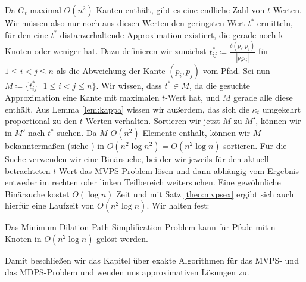 	Da $G_t$ maximal $O(n^2)$ Kanten enthält, gibt es eine endliche Zahl von $t$-Werten. 
	Wir müssen also nur noch aus diesen Werten den geringsten Wert $t^*$ ermitteln, für den eine $t^*$-distanzerhaltende Approximation existiert, die gerade noch k Knoten oder weniger hat. 
	Dazu definieren wir zunächst $t^*_{ij} \coloneqq\frac{\delta(p_i, p_j)}{|p_i p_j|}$ für $1\leq i < j \leq n$ als die Abweichung der Kante $(p_i, p_j)$ vom Pfad. Sei nun $M\coloneqq\{t^*_{ij}\ |\ 1\leq i < j \leq n\}$. 
	Wir wissen, dass $t^* \in M$, da die gesuchte Approximation eine Kante mit maximalen $t$-Wert hat, und $M$ gerade alle diese enthält. 
	Aus Lemma \ref{lem:kappa} wissen wir außerdem, das sich die $\kappa_t$ umgekehrt proportional zu den $t$-Werten verhalten. 
	Sortieren wir jetzt $M$ zu $M'$, können wir in $M'$ nach $t^*$ suchen. Da $M$ $O(n^2)$ Elemente enthält, können wir $M$ bekanntermaßen (siehe \cite{hagerup}) in $O(n^2\log n^2)=O(n^2\log n)$ sortieren. 
	Für die Suche verwenden wir eine Binärsuche, bei der wir jeweils für den aktuell betrachteten $t$-Wert das MVPS-Problem lösen und dann abhängig vom Ergebnis entweder im rechten oder linken Teilbereich weitersuchen. 
	Eine gewöhnliche Binärsuche kostet $O(\log n)$ Zeit und mit Satz \ref{theo:mvpsex} ergibt sich auch hierfür eine Laufzeit von $O(n^2\log n)$. Wir halten fest:
	\begin{theorem}
		Das Minimum Dilation Path Simplification Problem kann für Pfade mit n Knoten in $O(n^2 \log n)$ gelöst werden.
	\end{theorem}
	
	Damit beschließen wir das Kapitel über exakte Algorithmen für das MVPS- und das MDPS-Problem und wenden uns approximativen Lösungen zu.
